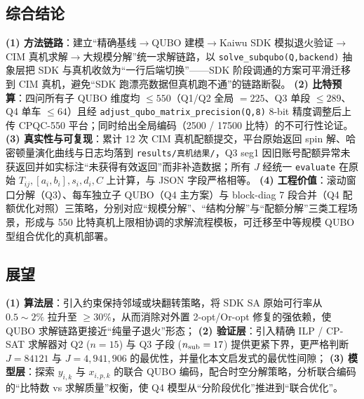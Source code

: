 \documentclass[UTF8,12pt,a4paper]{ctexart}
\begin{document}
\subsection{综合结论}

\textbf{(1) 方法链路}：建立``精确基线$\to$QUBO 建模$\to$Kaiwu SDK 模拟退火验证$\to$CIM 真机求解$\to$大规模分解''统一求解链路，以 \texttt{solve\_subqubo(Q,backend)} 抽象层把 SDK 与真机收敛为``一行后端切换''——SDK 阶段调通的方案可平滑迁移到 CIM 真机，避免``SDK 跑漂亮数据但真机跑不通''的链路断裂。
\textbf{(2) 比特预算}：四问所有子 QUBO 维度均 $\le 550$（Q1/Q2 全局 $=225$、Q3 单段 $\le 289$、Q4 单车 $\le 64$）且经 \texttt{adjust\_qubo\_matrix\_precision(Q,8)} 8-bit 精度调整后上传 CPQC-550 平台；同时给出全局编码（2500 / 17500 比特）的不可行性论证。
\textbf{(3) 真实性与可复现}：累计 12 次 CIM 真机配额提交，平台原始返回 spin 解、哈密顿量演化曲线与日志均落到 \texttt{results/真机结果/}，Q3 seg1 因旧账号配额异常未获返回并如实标注``未获得有效返回''而非补造数据；所有 $J$ 经统一 \texttt{evaluate} 在原始 $T_{ij},[a_i,b_i],s_i,d_i,C$ 上计算，与 JSON 字段严格相等。
\textbf{(4) 工程价值}：滚动窗口分解（Q3）、每车独立子 QUBO（Q4 主方案）与 block-diag 7 段合并（Q4 配额优化对照）三策略，分别对应``规模分解''、``结构分解''与``配额分解''三类工程场景，形成与 550 比特真机上限相协调的求解流程模板，可迁移至中等规模 QUBO 型组合优化的真机部署。

\subsection{展望}

\textbf{(1) 算法层}：引入约束保持邻域或块翻转策略，将 SDK SA 原始可行率从 $0.5\!\sim\!2\%$ 拉升至 $\ge 30\%$，从而消除对外置 2-opt/Or-opt 修复的强依赖，使 QUBO 求解链路更接近``纯量子退火''形态；
\textbf{(2) 验证层}：引入精确 ILP / CP-SAT 求解器对 Q2 ($n=15$) 与 Q3 子段 ($n_{\rm sub}=17$) 提供更紧下界，更严格判断 $J=84121$ 与 $J=4{,}941{,}906$ 的最优性，并量化本文启发式的最优性间隙；
\textbf{(3) 模型层}：探索 $y_{i,k}$ 与 $x_{i,p,k}$ 的联合 QUBO 编码，配合时空分解策略，分析联合编码的``比特数 vs 求解质量''权衡，使 Q4 模型从``分阶段优化''推进到``联合优化''。
\end{document}
